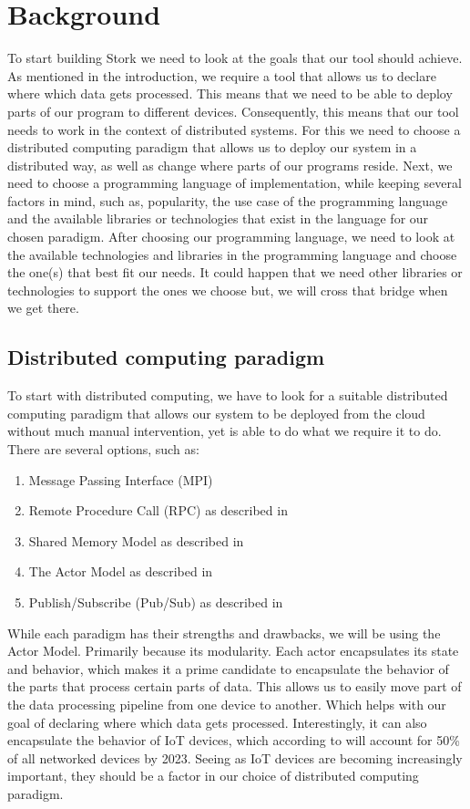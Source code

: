 \documentclass[a4paper]{article}
\begin{document}
\section{Background}
To start building Stork we need to look at the goals that our tool should achieve. As mentioned in the introduction, we require a tool that allows us to declare where which data gets processed. This means that we need to be able to deploy parts of our program to different devices. Consequently, this means that our tool needs to work in the context of distributed systems. For this we need to choose a distributed computing paradigm that allows us to deploy our system in a distributed way, as well as change where parts of our programs reside.
Next, we need to choose a programming language of implementation, while keeping several factors in mind, such as, popularity, the use case of the programming language and the available libraries or technologies that exist in the language for our chosen paradigm.
After choosing our programming language, we need to look at the available technologies and libraries in the programming language and choose the one(s) that best fit our needs. It could happen that we need other libraries or technologies to support the ones we choose but, we will cross that bridge when we get there.
\subsection{Distributed computing paradigm}
To start with distributed computing, we have to look for a suitable distributed computing paradigm that allows our system to be deployed from the cloud without much manual intervention, yet is able to do what we require it to do. There are several options, such as:
\begin{enumerate}
    \item Message Passing Interface (MPI)\cite{MPI}
    \item Remote Procedure Call (RPC) as described in \cite{RPC}
    \item Shared Memory Model as described in \cite{SMM}
    \item The Actor Model as described in \cite{ActorModel}
    \item Publish/Subscribe (Pub/Sub) as described in \cite{PubSub}
\end{enumerate}
While each paradigm has their strengths and drawbacks, we will be using the Actor Model. Primarily because its modularity. Each actor encapsulates its state and behavior, which makes it a prime candidate to encapsulate the behavior of the parts that process certain parts of data. This allows us to easily move part of the data processing pipeline from one device to another. Which helps with our goal of declaring where which data gets processed. Interestingly, it can also encapsulate the behavior of IoT devices, which according to \cite{differentnetworkneedsiot} will account for 50\% of all networked devices by 2023. Seeing as IoT devices are becoming increasingly important, they should be a factor in our choice of distributed computing paradigm.
\end{document}
